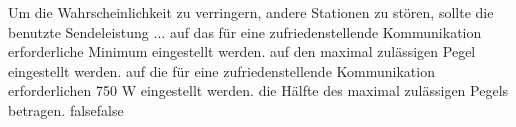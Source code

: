     {Um die Wahrscheinlichkeit zu verringern, andere Stationen zu stören, sollte die benutzte Sendeleistung ...}
    {auf das für eine zufriedenstellende Kommunikation erforderliche Minimum eingestellt werden.}
    {auf den maximal zulässigen Pegel eingestellt werden.}
    {auf die für eine zufriedenstellende Kommunikation erforderlichen 750 W eingestellt werden.}
    {die Hälfte des maximal zulässigen Pegels betragen.}
    {false}{false}